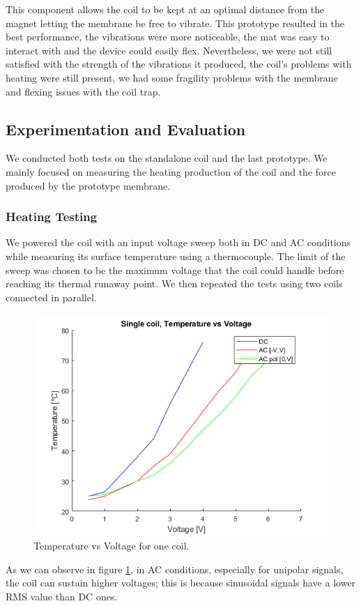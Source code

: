 This component allows the coil to be kept at an optimal distance from the magnet letting the membrane be free to vibrate.
This prototype resulted in the best performance, the vibrations were more noticeable, the mat was easy to interact with and the device could easily flex.
Nevertheless, we were not still satisfied with the strength of the vibrations it produced, the coil's problems with heating were still present, we had some fragility problems with the membrane and flexing issues with the coil trap. 

\subsection{Experimentation and Evaluation}
We conducted both tests on the standalone coil and the last prototype. We mainly focused on measuring the heating production of the coil and the force produced by the prototype membrane.
\subsubsection{Heating Testing}
We powered the coil with an input voltage sweep both in DC and AC conditions while measuring its surface temperature using a thermocouple. The limit of the sweep was chosen to be the maximum voltage that the coil could handle before reaching its thermal runaway point.
We then repeated the tests using two coils connected in parallel.
\begin{figure}[H]
    \centering
    \includegraphics[width = 0.5\linewidth]{Figures/Temp_vs_Volt_1_coil.png}
    \caption{Temperature vs Voltage for one coil.}
    \label{fig: Single_coil_heating_tests}
\end{figure}
As we can observe in figure \ref{fig: Single_coil_heating_tests}, in AC conditions, especially for unipolar signals, the coil can sustain higher voltages; this is because sinusoidal signals have a lower RMS value than DC ones.

